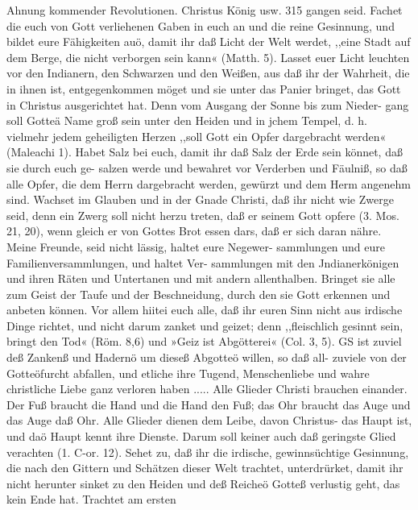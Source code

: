 Ahnung kommender Revolutionen. Christus König usw. 315
gangen seid. Fachet die euch von Gott verliehenen Gaben in
euch an und die reine Gesinnung, und bildet eure Fähigkeiten
auö, damit ihr daß Licht der Welt werdet, ,,eine Stadt auf dem
Berge, die nicht verborgen sein kann« (Matth. 5). Lasset euer
Licht leuchten vor den Indianern, den Schwarzen und den Weißen,
aus daß ihr der Wahrheit, die in ihnen ist, entgegenkommen
möget und sie unter das Panier bringet, das Gott in Christus
ausgerichtet hat. Denn vom Ausgang der Sonne bis zum Nieder-
gang soll Gotteä Name groß sein unter den Heiden und in
jchem Tempel, d. h. vielmehr jedem geheiligten Herzen ,,soll Gott
ein Opfer dargebracht werden« (Maleachi 1). Habet Salz bei euch,
damit ihr daß Salz der Erde sein könnet, daß sie durch euch ge-
salzen werde und bewahret vor Verderben und Fäulniß, so daß
alle Opfer, die dem Herrn dargebracht werden, gewürzt und dem
Herm angenehm sind. Wachset im Glauben und in der
Gnade Christi, daß ihr nicht wie Zwerge seid, denn ein Zwerg
soll nicht herzu treten, daß er seinem Gott opfere (3. Mos. 21, 20),
wenn gleich er von Gottes Brot essen dars, daß er sich daran
nähre. Meine Freunde, seid nicht lässig, haltet eure Negewer-
sammlungen und eure Familienversammlungen, und haltet Ver-
sammlungen mit den Jndianerkönigen und ihren Räten und
Untertanen und mit andern allenthalben. Bringet sie alle zum
Geist der Taufe und der Beschneidung, durch den sie Gott
erkennen und anbeten können. Vor allem hiitei euch alle, daß
ihr euren Sinn nicht aus irdische Dinge richtet, und nicht darum
zanket und geizet; denn ,,fleischlich gesinnt sein, bringt den Tod«
(Röm. 8,6) und »Geiz ist Abgötterei« (Col. 3, 5). GS ist zuviel deß
Zankenß und Hadernö um dieseß Abgotteö willen, so daß all-
zuviele von der Gotteöfurcht abfallen, und etliche ihre Tugend,
Menschenliebe und wahre christliche Liebe ganz verloren haben .....
Alle Glieder Christi brauchen einander. Der Fuß braucht
die Hand und die Hand den Fuß; das Ohr braucht das Auge
und das Auge daß Ohr. Alle Glieder dienen dem Leibe, davon
Christus- das Haupt ist, und daö Haupt kennt ihre Dienste.
Darum soll keiner auch daß geringste Glied verachten (1. C-or. 12).
Sehet zu, daß ihr die irdische, gewinnsüchtige Gesinnung, die
nach den Gittern und Schätzen dieser Welt trachtet, unterdrürket,
damit ihr nicht herunter sinket zu den Heiden und deß Reicheö
Gotteß verlustig geht, das kein Ende hat. Trachtet am ersten



